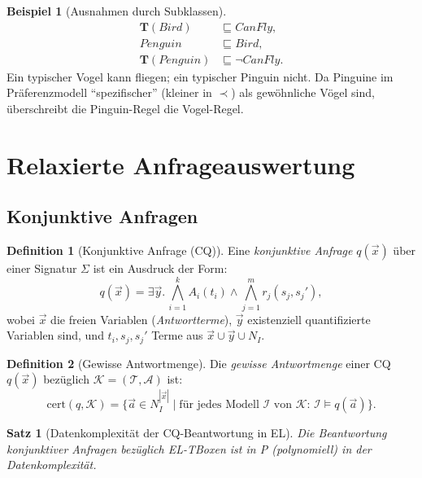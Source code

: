 ﻿\documentclass[a4paper,12pt]{article}
\theoremstyle{definition}
\newtheorem{definition}{Definition}[section]
\newtheorem{beispiel}{Beispiel}[section]
\theoremstyle{plain}
\newtheorem{satz}{Satz}[section]
\theoremstyle{remark}
\newcommand{\Tbox}{\ensuremath{\mathcal{T}}}
\newcommand{\Abox}{\ensuremath{\mathcal{A}}}
\newcommand{\KB}{\ensuremath{\mathcal{K}}}
\newcommand{\interp}[1]{\ensuremath{\mathcal{#1}}}
\begin{document}
\begin{beispiel}[Ausnahmen durch Subklassen]
\begin{align*}
  \mathbf{T}(\mathit{Bird}) &\sqsubseteq \mathit{CanFly}, \\
  \mathit{Penguin} &\sqsubseteq \mathit{Bird}, \\
  \mathbf{T}(\mathit{Penguin}) &\sqsubseteq \neg\mathit{CanFly}.
\end{align*}
Ein typischer Vogel kann fliegen; ein typischer Pinguin nicht.
Da Pinguine im Pr{\"{a}}ferenzmodell ``spezifischer'' (kleiner in $\prec$)
als gew{\"{o}}hnliche V{\"{o}}gel sind, {\"{u}}berschreibt die Pinguin-Regel die Vogel-Regel.
\end{beispiel}

\section{Relaxierte Anfrageauswertung}
\label{sec:anfragen}

\subsection{Konjunktive Anfragen}

\begin{definition}[Konjunktive Anfrage (CQ)]
Eine \emph{konjunktive Anfrage} $q(\vec{x})$ {\"{u}}ber einer Signatur $\Sigma$
ist ein Ausdruck der Form:
\[
  q(\vec{x}) = \exists \vec{y}.\,
  \bigwedge_{i=1}^{k} A_i(t_i) \wedge \bigwedge_{j=1}^{m} r_j(s_j, s_j'),
\]
wobei $\vec{x}$ die freien Variablen (\emph{Antwortterme}),
$\vec{y}$ existenziell quantifizierte Variablen sind,
und $t_i, s_j, s_j'$ Terme aus $\vec{x} \cup \vec{y} \cup N_I$.
\end{definition}

\begin{definition}[Gewisse Antwortmenge]
\label{def:cert}
Die \emph{gewisse Antwortmenge} einer CQ $q(\vec{x})$
bez{\"{u}}glich $\KB = (\Tbox, \Abox)$ ist:
\[
  \mathrm{cert}(q, \KB) =
  \bigl\{\vec{a} \in N_I^{|\vec{x}|} \;\big|\;
  \text{f{\"{u}}r jedes Modell } \interp{I} \text{ von } \KB:\,
  \interp{I} \models q(\vec{a})\bigr\}.
\]
\end{definition}

\begin{satz}[Datenkomplexit{\"{a}}t der CQ-Beantwortung in EL]
\label{satz:cq-data}
Die Beantwortung konjunktiver Anfragen bez{\"{u}}glich \textsf{EL}-TBoxen
ist in \textsc{P} (polynomiell) in der Datenkomplexit{\"{a}}t.
\end{satz}
\end{document}
